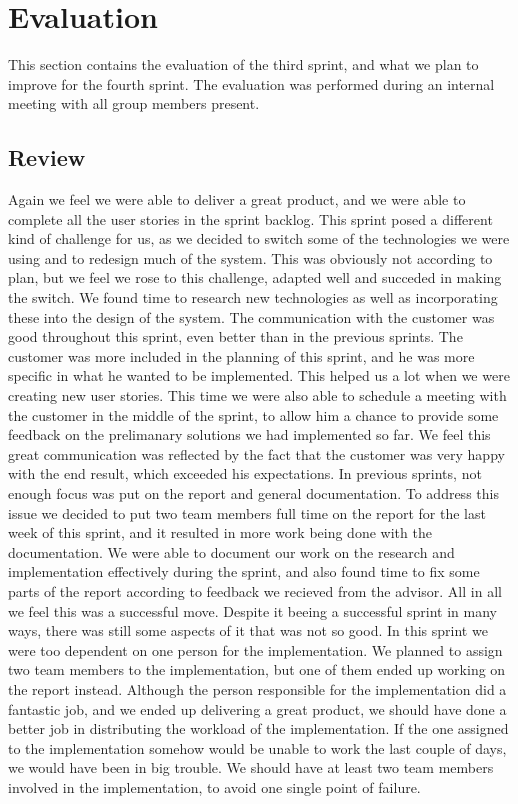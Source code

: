 \section{Evaluation}
This section contains the evaluation of the third sprint, and what we plan to improve for the fourth sprint. The evaluation was performed during an internal meeting with all group members present.

\subsection{Review}
Again we feel we were able to deliver a great product, and we were able to complete all the user stories in the sprint backlog. This sprint posed a different kind of challenge for us, as we decided to switch some of the technologies we were using and to redesign much of the system. This was obviously not according to plan, but we feel we rose to this challenge, adapted well and succeded in making the switch. We found time to research new technologies as well as incorporating these into the design of the system.
\newline
\newline
The communication with the customer was good throughout this sprint, even better than in the previous sprints. The customer was more included in the planning of this sprint, and he was more specific in what he wanted to be implemented. This helped us a lot when we were creating new user stories. This time we were also able to schedule a meeting with the customer in the middle of the sprint, to allow him a chance to provide some feedback on the prelimanary solutions we had implemented so far. We feel this great communication was reflected by the fact that the customer was very happy with the end result, which exceeded his expectations.
\newline
\newline
In previous sprints, not enough focus was put on the report and general documentation. To address this issue we decided to put two team members full time on the report for the last week of this sprint, and it resulted in more work being done with the documentation. We were able to document our work on the research and implementation effectively during the sprint, and also found time to fix some parts of the report according to feedback we recieved from the advisor. All in all we feel this was a successful move.
\newline
\newline
Despite it beeing a successful sprint in many ways, there was still some aspects of it that was not so good. In this sprint we were too dependent on one person for the implementation. We planned to assign two team members to the implementation, but one of them ended up working on the report instead. Although the person responsible for the implementation did a fantastic job, and we ended up delivering a great product, we should have done a better job in distributing the workload of the implementation. If the one assigned to the implementation somehow would be unable to work the last couple of days, we would have been in big trouble. We should have at least two team members involved in the implementation, to avoid one single point of failure.
